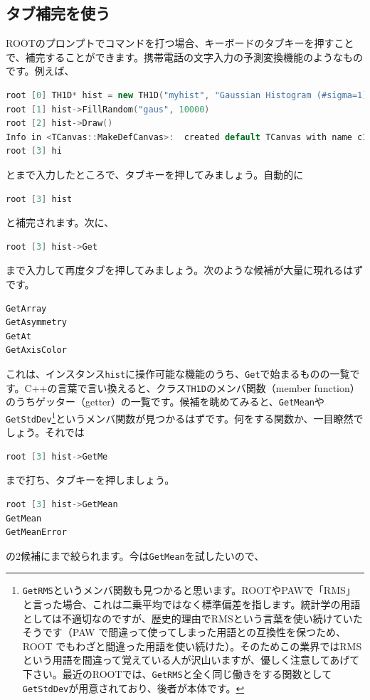 \subsection{タブ補完を使う}
ROOTのプロンプトでコマンドを打つ場合、キーボードのタブキーを押すことで、補完することができます。携帯電話の文字入力の予測変換機能のようなものです。例えば、
\begin{lstlisting}[language=c++]
root [0] TH1D* hist = new TH1D("myhist", "Gaussian Histogram (#sigma=1)", 50, -5, 5)
root [1] hist->FillRandom("gaus", 10000)
root [2] hist->Draw()
Info in <TCanvas::MakeDefCanvas>:  created default TCanvas with name c1
root [3] hi
\end{lstlisting}
とまで入力したところで、タブキーを押してみましょう。自動的に
\begin{lstlisting}[language=c++]
root [3] hist
\end{lstlisting}
と補完されます。次に、
\begin{lstlisting}[language=c++]
root [3] hist->Get
\end{lstlisting}
まで入力して再度タブを押してみましょう。次のような候補が大量に現れるはずです。
\begin{lstlisting}[language=c++]
GetArray
GetAsymmetry
GetAt
GetAxisColor
\end{lstlisting}
これは、インスタンス\texttt{hist}に操作可能な機能のうち、\texttt{Get}で始まるものの一覧です。C++の言葉で言い換えると、クラス\texttt{TH1D}のメンバ関数（member function）のうちゲッター（getter）の一覧です。候補を眺めてみると、\texttt{GetMean}や\texttt{GetStdDev}\footnote{\texttt{GetRMS}というメンバ関数も見つかると思います。ROOTやPAWで「RMS」と言った場合、これは二乗平均ではなく標準偏差を指します。統計学の用語としては不適切なのですが、歴史的理由でRMSという言葉を使い続けていたそうです（PAW で間違って使ってしまった用語との互換性を保つため、ROOT でもわざと間違った用語を使い続けた）。そのためこの業界ではRMSという用語を間違って覚えている人が沢山いますが、優しく注意してあげて下さい。最近のROOTでは、\texttt{GetRMS}と全く同じ働きをする関数として\texttt{GetStdDev}が用意されており、後者が本体です。}というメンバ関数が見つかるはずです。何をする関数か、一目瞭然でしょう。それでは
\begin{lstlisting}[language=c++]
root [3] hist->GetMe
\end{lstlisting}
まで打ち、タブキーを押しましょう。
\begin{lstlisting}[language=c++]
root [3] hist->GetMean
GetMean
GetMeanError
\end{lstlisting}
の2候補にまで絞られます。今は\texttt{GetMean}を試したいので、
